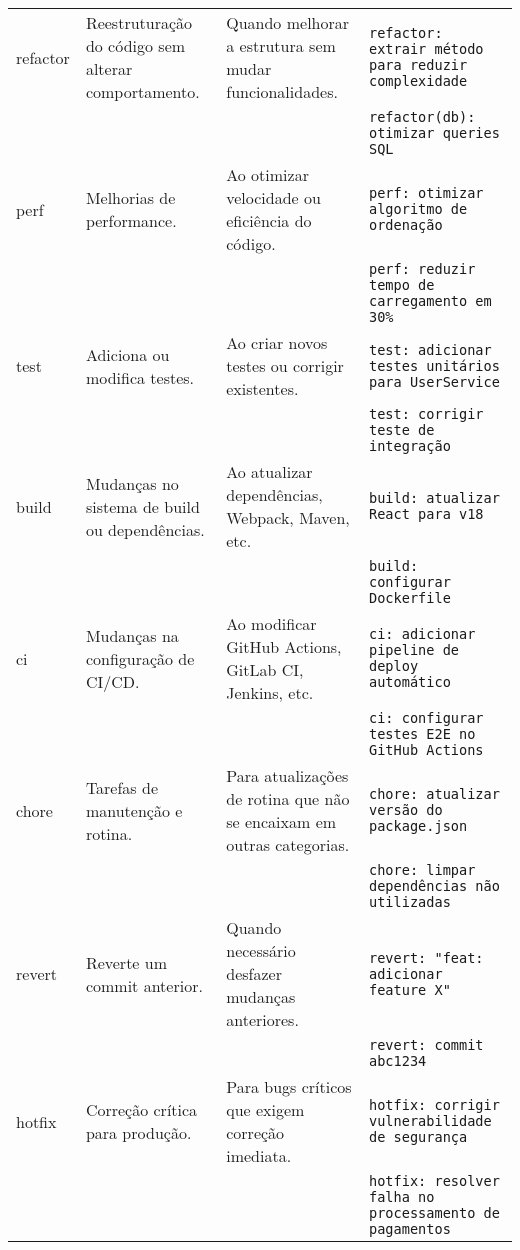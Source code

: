 \begin{longtable}{|p{}|p{}|p{}|p{}|}
  refactor & 
  Reestruturação do código sem alterar comportamento. &
  Quando melhorar a estrutura sem mudar funcionalidades. &
  \texttt{refactor: extrair método para reduzir complexidade} \\
  & & & \texttt{refactor(db): otimizar queries SQL} \\
  \hline

  perf & 
  Melhorias de performance. &
  Ao otimizar velocidade ou eficiência do código. &
  \texttt{perf: otimizar algoritmo de ordenação} \\
  & & & \texttt{perf: reduzir tempo de carregamento em 30\%} \\
  \hline

  test & 
  Adiciona ou modifica testes. &
  Ao criar novos testes ou corrigir existentes. &
  \texttt{test: adicionar testes unitários para UserService} \\
  & & & \texttt{test: corrigir teste de integração} \\
  \hline

  build & 
  Mudanças no sistema de build ou dependências. &
  Ao atualizar dependências, Webpack, Maven, etc. &
  \texttt{build: atualizar React para v18} \\
  & & & \texttt{build: configurar Dockerfile} \\
  \hline

  ci & 
  Mudanças na configuração de CI/CD. &
  Ao modificar GitHub Actions, GitLab CI, Jenkins, etc. &
  \texttt{ci: adicionar pipeline de deploy automático} \\
  & & & \texttt{ci: configurar testes E2E no GitHub Actions} \\
  \hline

  chore & 
  Tarefas de manutenção e rotina. &
  Para atualizações de rotina que não se encaixam em outras categorias. &
  \texttt{chore: atualizar versão do package.json} \\
  & & & \texttt{chore: limpar dependências não utilizadas} \\
  \hline

  revert & 
  Reverte um commit anterior. &
  Quando necessário desfazer mudanças anteriores. &
  \texttt{revert: "feat: adicionar feature X"} \\
  & & & \texttt{revert: commit abc1234} \\
  \hline

  hotfix & 
  Correção crítica para produção. &
  Para bugs críticos que exigem correção imediata. &
  \texttt{hotfix: corrigir vulnerabilidade de segurança} \\
  & & & \texttt{hotfix: resolver falha no processamento de pagamentos} \\
  \hline


\end{longtable}
